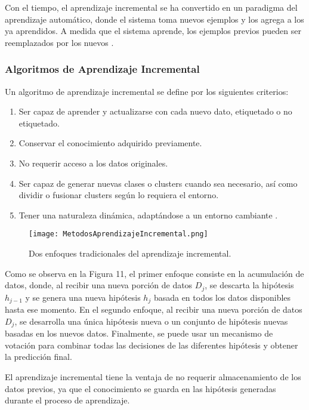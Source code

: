 Con el tiempo, el aprendizaje incremental se ha convertido en un paradigma del aprendizaje automático, donde el sistema toma nuevos ejemplos y los agrega a los ya aprendidos. A medida que el sistema aprende, los ejemplos previos pueden ser reemplazados por los nuevos \cite{liu2015}.

\subsubsection{Algoritmos de Aprendizaje Incremental}

Un algoritmo de aprendizaje incremental se define por los siguientes criterios:
\begin{enumerate}
    \item Ser capaz de aprender y actualizarse con cada nuevo dato, etiquetado o no etiquetado.
    \item Conservar el conocimiento adquirido previamente.
    \item No requerir acceso a los datos originales.
    \item Ser capaz de generar nuevas clases o clusters cuando sea necesario, así como dividir o fusionar clusters según lo requiera el entorno.
    \item Tener una naturaleza dinámica, adaptándose a un entorno cambiante \cite{Deshmukh2013}.
\end{enumerate}

\begin{figure}[H]
    \centering
    \texttt{[image: MetodosAprendizajeIncremental.png]}
    \caption{Dos enfoques tradicionales del aprendizaje incremental.}
    \label{fig:fig9}
\end{figure}

Como se observa en la Figura 11, el primer enfoque consiste en la acumulación de datos, donde, al recibir una nueva porción de datos \(D_j\), se descarta la hipótesis \(h_{j-1}\) y se genera una nueva hipótesis \(h_j\) basada en todos los datos disponibles hasta ese momento. En el segundo enfoque, al recibir una nueva porción de datos \(D_j\), se desarrolla una única hipótesis nueva o un conjunto de hipótesis nuevas basadas en los nuevos datos. Finalmente, se puede usar un mecanismo de votación para combinar todas las decisiones de las diferentes hipótesis y obtener la predicción final.

El aprendizaje incremental tiene la ventaja de no requerir almacenamiento de los datos previos, ya que el conocimiento se guarda en las hipótesis generadas durante el proceso de aprendizaje.

